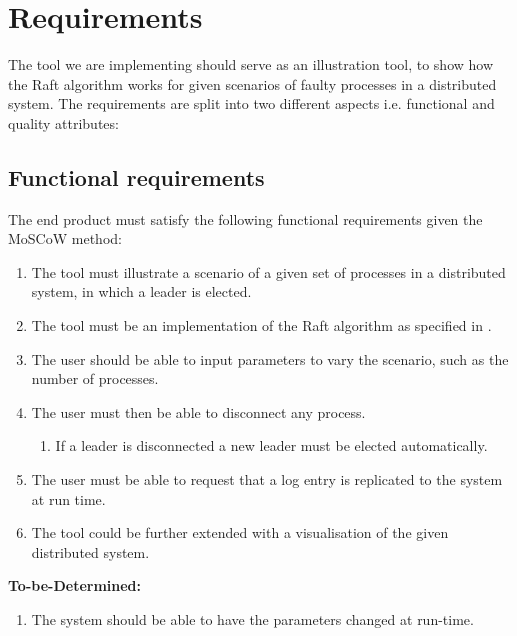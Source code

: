\section{Requirements} %
\label{sec:requirements}
The tool we are implementing should serve as an illustration tool, to show how the Raft algorithm works for given scenarios of faulty processes in a distributed system.
The requirements are split into two different aspects i.e. functional and quality attributes:
\subsection{Functional requirements}
The end product must satisfy the following functional requirements given the MoSCoW method:
\begin{enumerate}
\item The tool must illustrate a scenario of a given set of processes in a distributed system, in which a leader is elected.
\item The tool must be an implementation of the Raft algorithm as specified in \cite{Raft}.
\item The user should be able to input parameters to vary the scenario, such as the number of processes.
\item The user must then be able to disconnect any process.
	\begin{enumerate}
	\item If a leader is disconnected a new leader must be elected automatically.
	\end{enumerate}
\item The user must be able to request that a log entry is replicated to the system at run time.
\item The tool could be further extended with a visualisation of the given distributed system.
\end{enumerate}
\textbf{To-be-Determined:}
\begin{enumerate}
\item The system should be able to have the parameters changed at run-time.
\end{enumerate}
